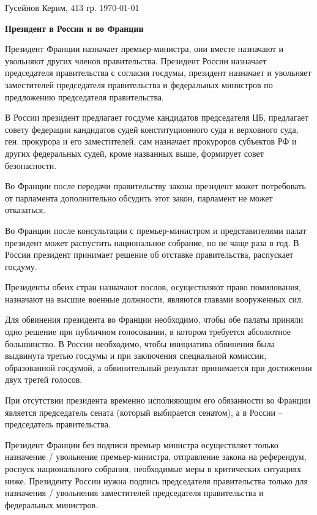 \documentclass[a4paper, 12pt]{article}
\begin{document}
\noindent
Гусейнов Керим, 413 гр.
\hfill 
\today

\begin{center}\bf
Президент в России и во Франции
\end{center}

Президент Франции назначает премьер-министра, они вместе назначают и увольняют других членов правительства. 
Президент России назначает председателя правительства с согласия госдумы, президент назначает и увольняет заместителей председателя правительства и федеральных министров по предложению председателя правительства. 

В России президент предлагает госдуме кандидатов председателя ЦБ, предлагает совету федерации кандидатов судей конституционного суда и верховного суда, ген. прокурора и его заместителей, сам назначает прокуроров субъектов РФ и других федеральных судей, кроме названных выше, формирует совет безопасности. 

Во Франции после передачи правительству закона президент может потребовать от парламента дополнительно обсудить этот закон, парламент не может отказаться. 

Во Франции после консультации с премьер-министром и представителями палат президент может распустить национальное собрание, но не чаще раза в год. 
В России президент принимает решение об отставке правительства, распускает госдуму. 

Президенты обеих стран назначают послов, осуществляют право помилования, назначают на высшие военные должности, являются главами вооруженных сил. 

Для обвинения президента во Франции необходимо, чтобы обе палаты приняли одно решение при публичном голосовании, в котором требуется абсолютное большинство. 
В России необходимо, чтобы инициатива обвинения была выдвинута третью госдумы и при заключения специальной комиссии, образованной госдумой, а обвинительный результат принимается при достижении двух третей голосов. 

При отсутствии президента временно исполняющим его обязанности во Франции является председатель сената (который выбирается сенатом), а в России -- председатель правительства. 

Президент Франции без подписи премьер министра осуществляет только назначение / увольнение премьер-министра, отправление закона на референдум, роспуск национального собрания, необходимые меры в критических ситуациях ниже. 
Президенту России нужна подпись председателя правительства только для назначения / увольнения заместителей председателя правительства и федеральных министров. 
\end{document}
